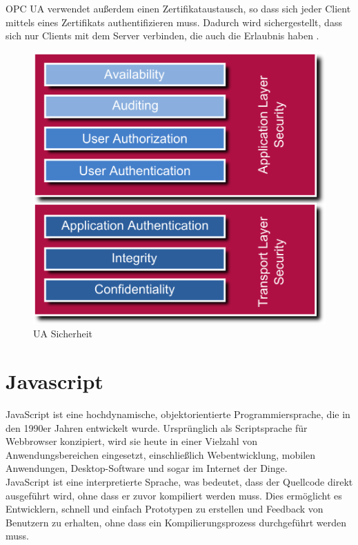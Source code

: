 OPC UA verwendet außerdem einen Zertifikataustausch, so dass sich jeder Client mittels eines Zertifikats authentifizieren muss. Dadurch wird sichergestellt, dass sich nur Clients mit dem Server verbinden, die auch die Erlaubnis haben \cite{Team.06.03.2023}.

\begin{figure}[htp]
    \centering
    \includegraphics[width=(\textwidth/2)]{Bild/uasecurity.png}
    \caption{UA Sicherheit\cite{Team.06.03.2023}}
    \label{fig:UA Sicherheit}
\end{figure}

\section{Javascript}
JavaScript ist eine hochdynamische, objektorientierte Programmiersprache, die in den 1990er Jahren entwickelt wurde. Ursprünglich als Scriptsprache für Webbrowser konzipiert, wird sie heute in einer Vielzahl von Anwendungsbereichen eingesetzt, einschließlich Webentwicklung, mobilen Anwendungen, Desktop-Software und sogar im Internet der Dinge.\\

JavaScript ist eine interpretierte Sprache, was bedeutet, dass der Quellcode direkt ausgeführt wird, ohne dass er zuvor kompiliert werden muss. Dies ermöglicht es Entwicklern, schnell und einfach Prototypen zu erstellen und Feedback von Benutzern zu erhalten, ohne dass ein Kompilierungsprozess durchgeführt werden muss.\\

